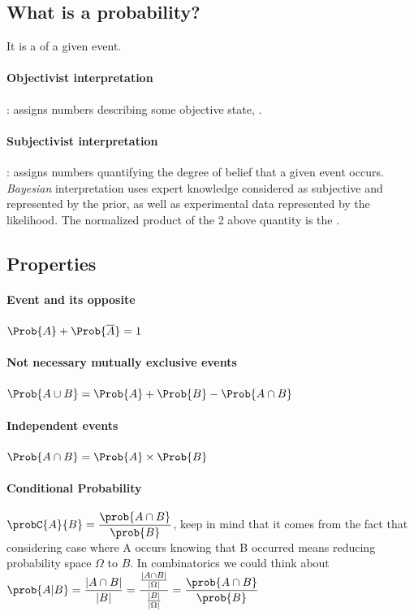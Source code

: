 \subsection{What is a probability?}
It is a  of a given event.

\paragraph{Objectivist interpretation \cite{wiki:probability_interpretation}}: assigns
numbers describing some objective state, . 

\paragraph{Subjectivist interpretation \cite{wiki:probability_interpretation}}: assigns
numbers quantifying the degree of belief that a given event occurs. \textit{Bayesian} 
interpretation uses expert knowledge considered as subjective and represented by the 
prior, as well as experimental data represented by the likelihood. The normalized product
of the 2 above quantity is the .


\subsection{Properties}
\paragraph{Event and its opposite}
$\Prob{A} + \Prob{\overline{A}} = 1$
\paragraph{Not necessary mutually exclusive events}
$\Prob{A\cup B} = \Prob{A} + \Prob{B} - \Prob{A\cap B}$
\paragraph{Independent events}
$\Prob{A\cap B} = \Prob{A} \times \Prob{B}$
\paragraph{Conditional Probability}
$\probC{A}{B} = \dfrac{\prob{A\cap B}}{\prob{B}}$, keep in mind that it comes from the fact that
considering case where A occurs knowing that B occurred means reducing probability space $\Omega$ to
$B$. In combinatorics we could think about $\prob{A|B} =
\dfrac{\lvert A\cap B \rvert}{\lvert B \rvert} = \dfrac{\frac{\lvert A\cap B \rvert}{\lvert\Omega\rvert}}{\frac{\lvert B
\rvert} {\lvert\Omega\rvert}} = \dfrac{\prob{A\cap B}}{\prob{B}}$

